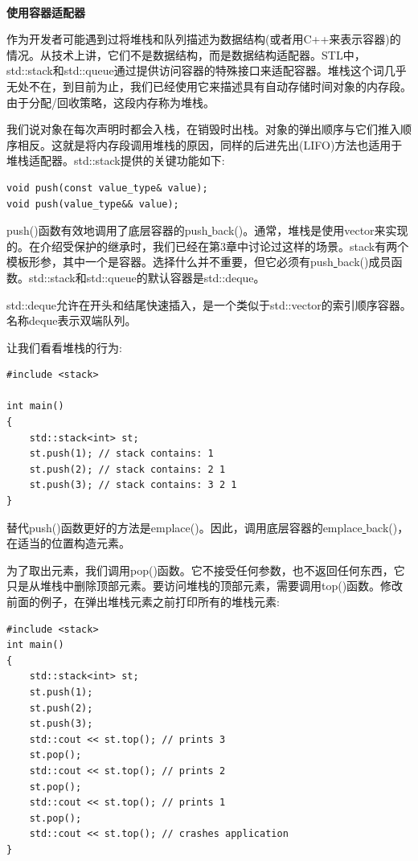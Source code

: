 \noindent\textbf{}\ \par
\textbf{使用容器适配器} \ \par
作为开发者可能遇到过将堆栈和队列描述为数据结构(或者用C++来表示容器)的情况。从技术上讲，它们不是数据结构，而是数据结构适配器。STL中，std::stack和std::queue通过提供访问容器的特殊接口来适配容器。堆栈这个词几乎无处不在，到目前为止，我们已经使用它来描述具有自动存储时间对象的内存段。由于分配/回收策略，这段内存称为堆栈。 \par
我们说对象在每次声明时都会入栈，在销毁时出栈。对象的弹出顺序与它们推入顺序相反。这就是将内存段调用堆栈的原因，同样的后进先出(LIFO)方法也适用于堆栈适配器。std::stack提供的关键功能如下: \par

\begin{lstlisting}[caption={}]
void push(const value_type& value);
void push(value_type&& value);
\end{lstlisting}

push()函数有效地调用了底层容器的push\underline{ }back()。通常，堆栈是使用vector来实现的。在介绍受保护的继承时，我们已经在第3章中讨论过这样的场景。stack有两个模板形参，其中一个是容器。选择什么并不重要，但它必须有push\underline{ }back()成员函数。std::stack和std::queue的默认容器是std::deque。\par
std::deque允许在开头和结尾快速插入，是一个类似于std::vector的索引顺序容器。名称deque表示双端队列。 \par
让我们看看堆栈的行为: \par

\begin{lstlisting}[caption={}]
#include <stack>

int main()
{
	std::stack<int> st;
	st.push(1); // stack contains: 1
	st.push(2); // stack contains: 2 1
	st.push(3); // stack contains: 3 2 1
}
\end{lstlisting}

替代push()函数更好的方法是emplace()。因此，调用底层容器的emplace\underline{ }back()，在适当的位置构造元素。 \par
为了取出元素，我们调用pop()函数。它不接受任何参数，也不返回任何东西，它只是从堆栈中删除顶部元素。要访问堆栈的顶部元素，需要调用top()函数。修改前面的例子，在弹出堆栈元素之前打印所有的堆栈元素: \par

\begin{lstlisting}[caption={}]
#include <stack>
int main()
{
	std::stack<int> st;
	st.push(1);
	st.push(2);
	st.push(3);
	std::cout << st.top(); // prints 3
	st.pop();
	std::cout << st.top(); // prints 2
	st.pop();
	std::cout << st.top(); // prints 1
	st.pop();
	std::cout << st.top(); // crashes application
}
\end{lstlisting}

